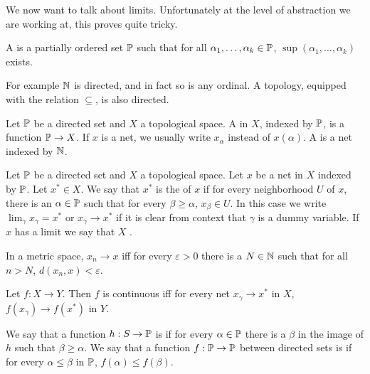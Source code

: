 \begin{subsec}
We now want to talk about limits. Unfortunately at the level of abstraction we are working at, this proves quite tricky.
\end{subsec}

\begin{definition}
A  is a partially ordered set $\mathbb{P}$ such that for all $\alpha_{1}, \dots, \alpha_{k} \in \mathbb{P}$, $\sup(\alpha_{1}, \dots, \alpha_{k})$ exists.
\end{definition}

\begin{subsec}
For example $\mathbb{N}$ is directed, and in fact so is any ordinal. A topology, equipped with the relation $\subseteq$, is also directed.
\end{subsec}

\begin{definition}
Let $\mathbb{P}$ be a directed set and $X$ a topological space.
A  in $X$, indexed by $\mathbb{P}$, is a function $\mathbb{P} \to X$. If $x$ is a net, we usually write $x_{\alpha}$ instead of $x(\alpha)$.
A  is a net indexed by $\mathbb{N}$.
\end{definition}

\begin{definition}\label{convergence of nets}
Let $\mathbb{P}$ be a directed set and $X$ a topological space. Let $x$ be a net in $X$ indexed by $\mathbb{P}$. Let $x^{*} \in X$.
We say that $x^{*}$ is the  of $x$ if for every neighborhood $U$ of $x$, there is an $\alpha \in \mathbb{P}$ such that for every $\beta \geq \alpha$, $x_{\beta} \in U$.
In this case we write $\lim_{\gamma} x_{\gamma} = x^{*}$ or $x_{\gamma} \to x^{*}$ if it is clear from context that $\gamma$ is a dummy variable.
If $x$ has a limit we say that $X$ .
\end{definition}

\begin{lemma}
In a metric space, $x_{n} \to x$ iff for every $\varepsilon > 0$ there is a $N \in \mathbb{N}$ such that for all $n > N$, $d(x_{n}, x) < \varepsilon$.
\end{lemma}

\begin{lemma}
Let $f: X \to Y$. Then $f$ is continuous iff for every net $x_{\gamma} \to x^{*}$ in $X$, $f(x_{\gamma}) \to f(x^{*})$ in $Y$.
\end{lemma}

\begin{definition}
We say that a function $h: S \to \mathbb{P}$ is  if for every $\alpha \in \mathbb{P}$ there is a $\beta$ in the image of $h$ such that $\beta \geq \alpha$.
We say that a function $f: \mathbb{P} \to \mathbb{P}$ between directed sets is  if for every $\alpha \leq \beta$ in $\mathbb{P}$, $f(\alpha) \leq f(\beta)$.
\end{definition}

